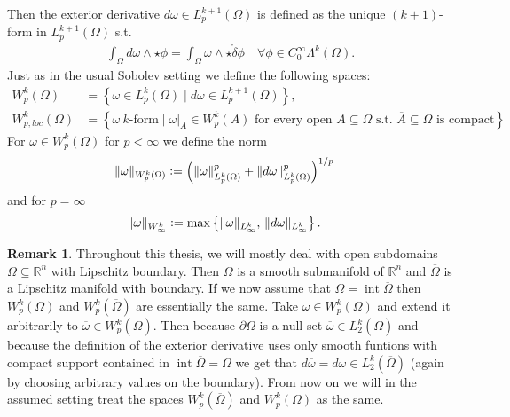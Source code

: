 \documentclass[12pt,a4paper]{article}
\numberwithin{equation}{subsection}
\numberwithin{lemma}{subsection}
\theoremstyle{definition}
\newtheorem{remark}[lemma]{Remark}
\DeclareMathOperator{\interior}{int}
\newcommand{\norm}[2]{\lVert #1 \rVert_{#2}}
\newcommand{\omegabar}{\overline{\Omega}}
\newcommand{\real}{\mathbb{R}}
\begin{document}
Then the exterior derivative $ d\omega \in L^{k+1}_p(\Omega)$ is defined as
the unique $(k+1)$-form in $L^{k+1}_p(\Omega)$ s.t. 
\begin{align*}
\int_\Omega d\omega \wedge \star\phi = \int_\Omega \omega \wedge 
\star\mathring{\delta}\phi
\quad \forall \phi \in C_0^\infty \Lambda^{k}(\Omega).
\end{align*}
Just as in the usual Sobolev setting we define the following spaces:
\begin{align*}
W^k_p(\Omega) &= \left\{ \omega \in L^k_p(\Omega) \mid 
     d\omega \in L_p^{k+1}(\Omega) \right\}, \\ 
W^k_{p,loc}(\Omega) &= \left\{ \omega \ k \text{-form} \mid 
\omega|_A \in W^k_p(A) \text{ for every open } A \subseteq \Omega 
\text{ s.t. } \overline{A} \subseteq \Omega \text{ is compact} %
\right\}.
\end{align*}
For $\omega \in W^k_p(\Omega)$ for $p<\infty$ we define the norm 
\begin{align*}
\lVert \omega \rVert _{W^k_p(\Omega)} &\vcentcolon= 
\left( \norm{\omega}{L^k_p(\Omega)}^p 
    + \norm{d\omega}{L^k_p(\Omega)}^p \right)^{1/p}
\end{align*}
and for $p=\infty$
\begin{align*}
    \lVert \omega \rVert _{W^k_\infty} &\vcentcolon= 
    \max\left\{ \norm{\omega}{L^k_\infty},\, \norm{d\omega}{L^k_\infty}
    \right\}.
\end{align*}

\begin{remark}
    Throughout this thesis, we will mostly deal with open subdomains $\Omega 
    \subseteq \real^n$ with Lipschitz boundary. Then $\Omega$
    is a smooth submanifold of $\real^n$ and $\omegabar$ is a 
    Lipschitz manifold with boundary. If we now assume that
    $\Omega = \interior \omegabar$ then $W^k_p(\Omega)$ and $W^k_p(\omegabar)$
    are essentially the same. Take $\omega \in W^k_p(\Omega)$ and extend 
    it arbitrarily to $\overline{\omega} \in W^k_p(\omegabar)$. Then because 
    $\partial \Omega$ is a null set $\overline{\omega} \in L_2^k(\omegabar)$ and 
    because the definition of the exterior derivative uses only smooth 
    funtions with compact support contained in $\interior \omegabar = \Omega$ 
    we get that $d\overline{\omega} = d\omega \in L^k_2(\omegabar)$ (again 
    by choosing arbitrary values on the boundary). From now on we will in the
    assumed setting treat the spaces $W^k_p(\omegabar)$ and $W^k_p(\Omega)$ 
    as the same.
\end{remark}
    
\end{document}
